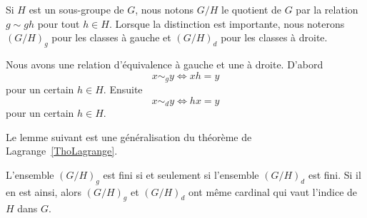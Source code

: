 Si \( H\) est un sous-groupe de  \( G\), nous notons \( G/H\) le quotient de $G$ par la relation \( g\sim gh\) pour tout \( h\in H\). Lorsque la distinction est importante, nous noterons \( (G/H)_g\) pour les classes à gauche et \( (G/H)_d\) pour les classes à droite.

Nous avons une relation d'équivalence à gauche et une à droite. D'abord
\begin{equation}
    x\sim_g y\Leftrightarrow xh=y
\end{equation}
pour un certain \( h\in H\). Ensuite
\begin{equation}
    x\sim_d y\Leftrightarrow hx=y
\end{equation}
pour un certain \( h\in H\).

Le lemme suivant est une généralisation du théorème de Lagrange~\ref{ThoLagrange}.

\begin{lemma}
    L'ensemble \( (G/H)_g\) est fini si et seulement si l'ensemble \( (G/H)_d\) est fini. Si il en est ainsi, alors \( (G/H)_g\) et \( (G/H)_d\) ont même cardinal qui vaut l'indice de \( H\) dans \( G\).
\end{lemma}

